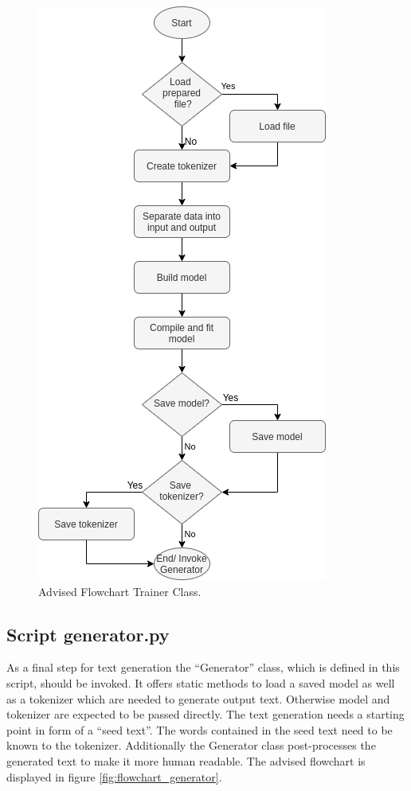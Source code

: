 \documentclass[conference]{IEEEtran}
\begin{document}
\begin{figure}[htbp]
\centerline{\includegraphics[scale=0.65]{pictures/flowchart_trainer.png}}
\caption{Advised Flowchart Trainer Class.}
\label{fig:flowchart_trainer}
\end{figure}

\subsection{Script generator.py}\label{subsec_generator}

As a final step for text generation the ``Generator'' class, which is defined in this script, should be invoked. It offers static methods to load a saved model as well as a tokenizer which are needed to generate output text. Otherwise model and tokenizer are expected to be passed directly. The text generation needs a starting point in form of a ``seed text''. The words contained in the seed text need to be known to the tokenizer. Additionally the Generator class post-processes the generated text to make it more human readable. The advised flowchart is displayed in figure \ref{fig:flowchart_generator}.
\end{document}
